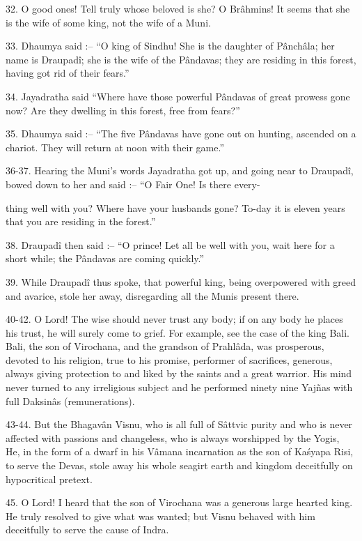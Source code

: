 32. O good ones! Tell truly whose beloved is she? O Br\^ahmins! It seems that she is the wife of some king, not the wife of a Muni.

33. Dhaumya said :-- ``O king of Sindhu! She is the daughter of P\^anch\^ala; her name is Draupad\^i; she is the wife of the P\^andavas; they are residing in this forest, having got rid of their fears.''

34. Jayadratha said ``Where have those powerful P\^andavas of great prowess gone now? Are they dwelling in this forest, free from fears?''

35. Dhaumya said :-- ``The five P\^andavas have gone out on hunting, ascended on a chariot. They will return at noon with their game.''

36-37. Hearing the Muni's words Jayadratha got up, and going near to Draupad\^i, bowed down to her and said :-- ``O Fair One! Is there every-

thing well with you? Where have your husbands gone? To-day it is eleven years that you are residing in the forest.''

38. Draupad\^i then said :-- ``O prince! Let all be well with you, wait here for a short while; the P\^andavas are coming quickly.''

39. While Draupad\^i thus spoke, that powerful king, being overpowered with greed and avarice, stole her away, disregarding all the Munis present there.

40-42. O Lord! The wise should never trust any body; if on any body he places his trust, he will surely come to grief. For example, see the case of the king Bali. Bali, the son of Virochana, and the grandson of Prahl\^ada, was prosperous, devoted to his religion, true to his promise, performer of sacrifices, generous, always giving protection to and liked by the saints and a great warrior. His mind never turned to any irreligious subject and he performed ninety nine Yaj\~nas with full Daksin\^as (remunerations).

43-44. But the Bhagav\^an Visnu, who is all full of S\^attvic purity and who is never affected with passions and changeless, who is always worshipped by the Yogis, He, in the form of a dwarf in his V\^amana incarnation as the son of Ka\'syapa Risi, to serve the Devas, stole away his whole seagirt earth and kingdom deceitfully on hypocritical pretext.

45. O Lord! I heard that the son of Virochana was a generous large hearted king. He truly resolved to give what was wanted; but Visnu behaved with him deceitfully to serve the cause of Indra.

